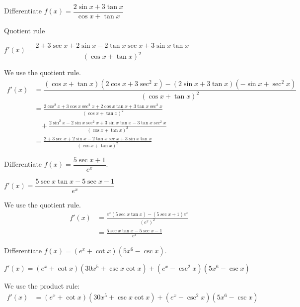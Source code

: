 \begin{Mquestion}
Differentiate $f(x) = \dfrac{2\sin x + 3 \tan x}{\cos x + \tan x}$
\end{Mquestion}
\begin{hint}
Quotient rule
\end{hint}
\begin{answer}
$f'(x)=\dfrac{2+3 \sec x + 2 \sin x -2\tan x \sec x+3\sin x \tan x }{(\cos x + \tan x)^2}$
\end{answer}
\begin{solution}
We use the quotient rule.
\begin{align*}
f'(x)&=\dfrac{(\cos x + \tan x)(2\cos x + 3 \sec^2 x)-(2\sin x+3\tan x)(-\sin x + \sec^2 x)}{(\cos x + \tan x)^2}\\
&=\frac{2\cos^2x+3\cos x \sec^2 x + 2 \cos x \tan x + 3 \tan x \sec^2 x}{(\cos x + \tan x)^2}\\
&~~~~
+\frac{2\sin^2x-2\sin x \sec^2x+3\sin x \tan x -3\tan x \sec^2 x}{(\cos x + \tan x)^2}\\
&=\frac{2+3 \sec x + 2 \sin x -2\tan x \sec x+3\sin x \tan x }{(\cos x + \tan x)^2}
\end{align*}
\end{solution}

\begin{Mquestion}
Differentiate $f(x) = \dfrac{5\sec x+1}{e^x}$.
\end{Mquestion}
\begin{answer}
$f'(x)=\dfrac{5\sec x \tan x - 5 \sec x - 1}{e^x}$
\end{answer}
\begin{solution}
We use the quotient rule.
\begin{align*}
f'(x) &= \frac{e^x(5\sec x \tan x)-(5\sec x + 1) e^x}{(e^{x})^2}\\
&=\frac{5\sec x \tan x - 5 \sec x - 1}{e^x}
\end{align*}
\end{solution}

\begin{question}
Differentiate $f(x)=(e^x+\cot x)(5x^6-\csc x)$.
\end{question}
\begin{answer}
$f'(x)=(e^x+\cot x)(30x^5+\csc x \cot x)+(e^x-\csc^2x)(5x^6-\csc x)$
\end{answer}
\begin{solution}
We use the product rule:
\begin{align*}
f'(x)&=(e^x+\cot x)(30x^5+\csc x \cot x)+(e^x-\csc^2x)(5x^6-\csc x)
\end{align*}
\end{solution}

